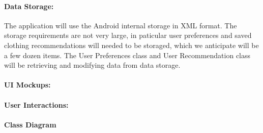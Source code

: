 \documentclass[12pt,a4paper]{article}
\begin{document}
\paragraph{Data Storage:} The application will use the Android internal storage in XML format.
The storage requirements are not very large, in paticular user preferences and saved clothing recommendations
will needed to be storaged, which we anticipate will be a few dozen items. The User Preferences class and User Recommendation class will be retrieving and modifying data from data storage.

\paragraph{UI Mockups:}

\paragraph{User Interactions:}

\paragraph{Class Diagram}
\end{document}
